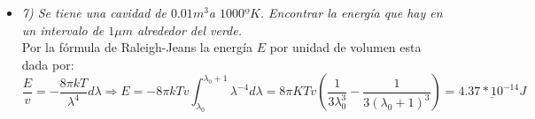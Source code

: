 \documentclass{article}
\begin{document}
\begin{itemize}
\item \textit{7) Se tiene una cavidad de $0.01 m^3$a $1000ºK$. Encontrar la energía que hay en un intervalo de $1\mu m$ alrededor del verde.} \\ 
Por la fórmula de Raleigh-Jeans la energía $E$ por unidad de volumen  esta dada por: $$ \frac{E}{v}=-\frac{8 \pi k T }{\lambda^4} d \lambda \Rightarrow E=-8 \pi k T v \int_{\lambda_{0}}^{\lambda_{0}+1} \lambda ^{-4} d \lambda=8\pi K T v ( \frac{1}{3\lambda_{0}^{3}}-\frac{1}{3(\lambda_{0}+1)^3} ) = \underline{4.37*10^{-14}J}  $$


\end{itemize}
\end{document}
